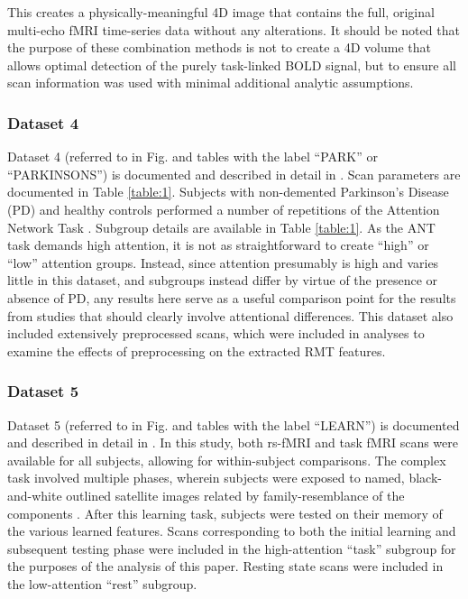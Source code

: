 \documentclass[NETN,manuscript]{stjour-new}
\begin{document}
This creates a physically-meaningful 4D image that contains the full, original multi-echo fMRI
time-series data without any alterations. It should be noted that the purpose of these combination
methods is not to create a 4D volume that allows optimal detection of the purely task-linked BOLD
signal, but to ensure all scan information was used with minimal additional analytic assumptions.

\subsubsection{Dataset 4}
Dataset 4 (referred to in Fig. and tables with the label ``PARK'' or ``PARKINSONS'') is documented and
described in detail in \cite{madhyasthaDynamicConnectivityRest2015}. Scan parameters are documented
in Table \ref{table:1}. Subjects with non-demented Parkinson’s Disease (PD) and healthy controls performed a
number of repetitions of the Attention Network Task
\citep[ANT;][]{fanActivationAttentionalNetworks2005}. Subgroup details are available in Table \ref{table:1}. As the ANT
task demands high attention, it is not as straightforward to create ``high'' or ``low'' attention
groups. Instead, since attention presumably is high and varies little in this dataset, and subgroups
instead differ by virtue of the presence or absence of PD, any results here serve as a useful
comparison point for the results from studies that should clearly involve attentional differences.
This dataset also included extensively preprocessed scans, which were included in analyses to
examine the effects of preprocessing on the extracted RMT features.

\subsubsection{Dataset 5}
Dataset 5 (referred to in Fig. and tables with the label ``LEARN'') is documented and described in
detail in \cite{schapiroHumanHippocampalReplay2018}. In this study, both rs-fMRI and task fMRI scans
were available for all subjects, allowing for within-subject comparisons. The complex task involved
multiple phases, wherein subjects were exposed to named, black-and-white outlined satellite images
related by family-resemblance of the components \citep[see figure 1
of][]{schapiroHumanHippocampalReplay2018}. After this learning task, subjects were tested on their
memory of the various learned features. Scans corresponding to both the initial learning and
subsequent testing phase were included in the high-attention ``task'' subgroup for the purposes of
the analysis of this paper. Resting state scans were included in the low-attention ``rest''
subgroup.
\end{document}

